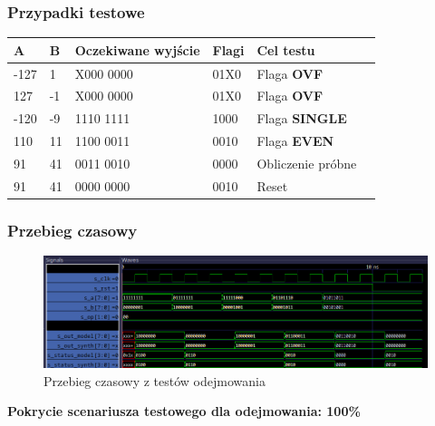 \documentclass[12pt]{article}
\begin{document}
	\subsubsection*{Przypadki testowe}
	
		\begin{table}[H]
			\centering
				\begin{adjustbox}{center}
			\begin{tabular}{|l|l|l|l|l|l|}
				\hline
				\textbf{A} & \textbf{B} & \textbf{Oczekiwane wyjście} & \textbf{Flagi} & \textbf{Cel testu} \\ \hline
				-127 & 1 &  X000 0000 & 01X0 & Flaga \textbf{OVF} \\ \hline
				127 & -1 &  X000 0000 & 01X0 & Flaga \textbf{OVF} \\ \hline
				-120 & -9 &  1110 1111 & 1000 & Flaga \newline \textbf{SINGLE} \\ \hline
				110 & 11 & 1100 0011 & 0010 & Flaga \textbf{EVEN} \\ \hline
				91 & 41 &  0011 0010 & 0000& Obliczenie próbne \\ \hline
				91 & 41 &  0000 0000 & 0010 & Reset \\ \hline
			\end{tabular}
			\end{adjustbox}
		\end{table}

	\subsubsection*{Przebieg czasowy}
		\begin{figure}[H]
		\begin{center}
			\includegraphics[width=\textwidth]{../Testy/Wyniki_testow/Testy_sub.png}
			\caption*{Przebieg czasowy z testów odejmowania}
			\label{figure:test_sub}
		\end{center}
	\end{figure}
	\vspace{-20pt}
	\textbf{Pokrycie scenariusza testowego dla odejmowania: 100\%}
	
\end{document}
